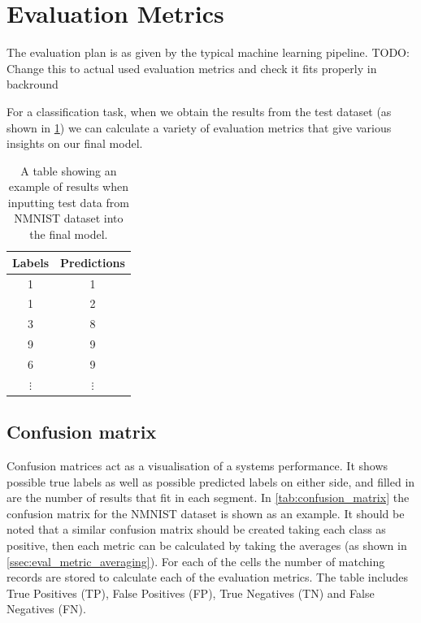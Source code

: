 \section{Evaluation Metrics} \label{sec:evalutaion_metrics}

The evaluation plan is as given by the typical machine learning pipeline\cite{IntroToML}. \color{red} TODO: Change this to actual used evaluation metrics and check it fits properly in backround \color{black}

For a classification task, when we obtain the results from the test dataset (as shown in \cref{tab:possible_results}) we can calculate a variety of evaluation metrics that give various insights on our final model.

\begin{table}[htb]
    \centering
    \begin{tabular}{|| c  | c ||}
        \hline
        Labels     & Predictions \\
        \hline \hline
        1          & 1           \\
        \hline
        1          & 2           \\
        \hline
        3          & 8           \\
        \hline
        9          & 9           \\
        \hline
        6          & 9           \\
        \hline
        $ \vdots $ & $ \vdots $  \\
    \end{tabular}
    \caption{A table showing an example of results when inputting test data from NMNIST dataset\cite{NMNIST} into the final model.}
    \label{tab:possible_results}
\end{table}

\subsection{Confusion matrix}

Confusion matrices act as a visualisation of a systems performance. It shows possible true labels as well as possible predicted labels on either side, and filled in are the number of results that fit in each segment. In \cref{tab:confusion_matrix} the confusion matrix for the NMNIST dataset is shown as an example. It should be noted that a similar confusion matrix should be created taking each class as positive, then each metric can be calculated by taking the averages (as shown in \cref{ssec:eval_metric_averaging}). For each of the cells the number of matching records are stored to calculate each of the evaluation metrics. The table includes True Positives (TP), False Positives (FP), True Negatives (TN) and False Negatives (FN).

